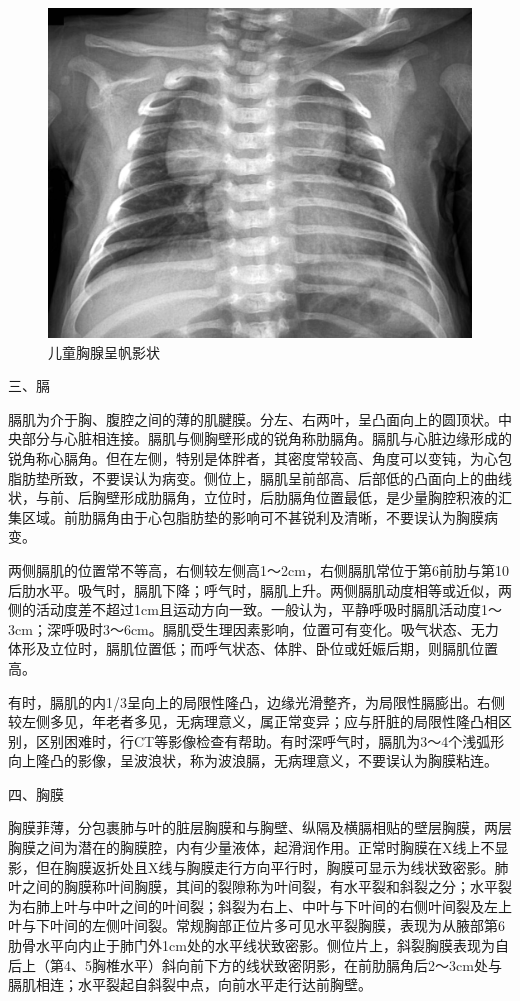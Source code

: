 \begin{figure}[!htbp]
 \centering
 \includegraphics{./images/Image00134.jpg}
 \captionsetup{justification=centering}
 \caption{儿童胸腺呈帆影状}
 \label{fig3-1-5}
  \end{figure} 

三、膈

膈肌为介于胸、腹腔之间的薄的肌腱膜。分左、右两叶，呈凸面向上的圆顶状。中央部分与心脏相连接。膈肌与侧胸壁形成的锐角称肋膈角。膈肌与心脏边缘形成的锐角称心膈角。但在左侧，特别是体胖者，其密度常较高、角度可以变钝，为心包脂肪垫所致，不要误认为病变。侧位上，膈肌呈前部高、后部低的凸面向上的曲线状，与前、后胸壁形成肋膈角，立位时，后肋膈角位置最低，是少量胸腔积液的汇集区域。前肋膈角由于心包脂肪垫的影响可不甚锐利及清晰，不要误认为胸膜病变。

两侧膈肌的位置常不等高，右侧较左侧高1～2cm，右侧膈肌常位于第6前肋与第10后肋水平。吸气时，膈肌下降；呼气时，膈肌上升。两侧膈肌动度相等或近似，两侧的活动度差不超过1cm且运动方向一致。一般认为，平静呼吸时膈肌活动度1～3cm；深呼吸时3～6cm。膈肌受生理因素影响，位置可有变化。吸气状态、无力体形及立位时，膈肌位置低；而呼气状态、体胖、卧位或妊娠后期，则膈肌位置高。

有时，膈肌的内1/3呈向上的局限性隆凸，边缘光滑整齐，为局限性膈膨出。右侧较左侧多见，年老者多见，无病理意义，属正常变异；应与肝脏的局限性隆凸相区别，区别困难时，行CT等影像检查有帮助。有时深呼气时，膈肌为3～4个浅弧形向上隆凸的影像，呈波浪状，称为波浪膈，无病理意义，不要误认为胸膜粘连。

四、胸膜

胸膜菲薄，分包裹肺与叶的脏层胸膜和与胸壁、纵隔及横膈相贴的壁层胸膜，两层胸膜之间为潜在的胸膜腔，内有少量液体，起滑润作用。正常时胸膜在X线上不显影，但在胸膜返折处且X线与胸膜走行方向平行时，胸膜可显示为线状致密影。肺叶之间的胸膜称叶间胸膜，其间的裂隙称为叶间裂，有水平裂和斜裂之分；水平裂为右肺上叶与中叶之间的叶间裂；斜裂为右上、中叶与下叶间的右侧叶间裂及左上叶与下叶间的左侧叶间裂。常规胸部正位片多可见水平裂胸膜，表现为从腋部第6肋骨水平向内止于肺门外1cm处的水平线状致密影。侧位片上，斜裂胸膜表现为自后上（第4、5胸椎水平）斜向前下方的线状致密阴影，在前肋膈角后2～3cm处与膈肌相连；水平裂起自斜裂中点，向前水平走行达前胸壁。

